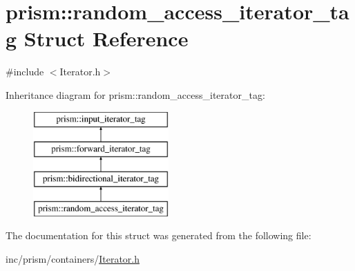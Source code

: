 \hypertarget{structprism_1_1random__access__iterator__tag}{}\section{prism\+:\+:random\+\_\+access\+\_\+iterator\+\_\+tag Struct Reference}
\label{structprism_1_1random__access__iterator__tag}


{\ttfamily \#include $<$Iterator.\+h$>$}

Inheritance diagram for prism\+:\+:random\+\_\+access\+\_\+iterator\+\_\+tag\+:\begin{figure}[H]
\begin{center}
\leavevmode
\includegraphics[height=4.000000cm]{structprism_1_1random__access__iterator__tag}
\end{center}
\end{figure}


The documentation for this struct was generated from the following file\+:\begin{DoxyCompactItemize}
\item 
inc/prism/containers/\hyperlink{_iterator_8h}{Iterator.\+h}\end{DoxyCompactItemize}
